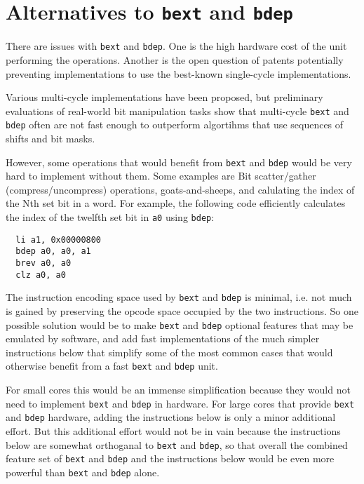\chapter{Alternatives to \texttt{bext} and \texttt{bdep}}

There are issues with \texttt{bext} and \texttt{bdep}. One is the high hardware cost
of the unit performing the operations. Another is the open question of patents potentially
preventing implementations to use the best-known single-cycle implementations.

Various multi-cycle implementations have been proposed, but preliminary evaluations of
real-world bit manipulation tasks show that multi-cycle \texttt{bext} and \texttt{bdep}
often are not fast enough to outperform algortihms that use sequences of shifts and bit
masks.

However, some operations that would benefit from \texttt{bext} and \texttt{bdep} would
be very hard to implement without them. Some examples are Bit scatter/gather
(compress/uncompress) operations, goats-and-sheeps, and calulating the index of the Nth
set bit in a word. For example, the following code efficiently calculates the
index of the twelfth set bit in {\tt a0} using \texttt{bdep}:

\begin{verbatim}
  li a1, 0x00000800
  bdep a0, a0, a1
  brev a0, a0
  clz a0, a0
\end{verbatim}

The instruction encoding space used by \texttt{bext} and \texttt{bdep} is
minimal, i.e. not much is gained by preserving the opcode space occupied
by the two instructions. So one possible solution would be to make \texttt{bext}
and \texttt{bdep} optional features that may be emulated by software, and add
fast implementations of the much simpler instructions below that simplify some
of the most common cases that would otherwise benefit from a fast \texttt{bext}
and \texttt{bdep} unit.

For small cores this would be an immense simplification because they would not
need to implement \texttt{bext} and \texttt{bdep} in hardware. For large cores
that provide \texttt{bext} and \texttt{bdep} hardware, adding the instructions
below is only a minor additional effort. But this additional effort would not
be in vain because the instructions below are somewhat orthoganal to
\texttt{bext} and \texttt{bdep}, so that overall the combined feature set of
\texttt{bext} and \texttt{bdep} and the instructions below would be even more
powerful than \texttt{bext} and \texttt{bdep} alone.

